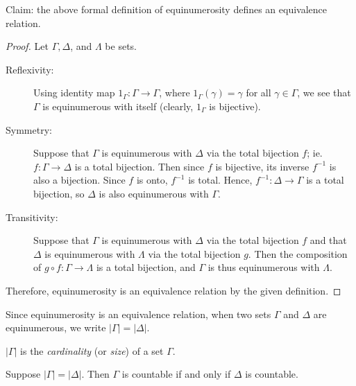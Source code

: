 \documentclass[../../include/open-logic-section]{subfiles}
\begin{document}
\begin{explain} Claim: the above formal definition of equinumerosity defines an equivalence relation.

\begin{proof} Let $\Gamma, \Delta$, and $\Lambda$ be sets.

\begin{description}

\item[Reflexivity:] Using identity map $1_\Gamma : \Gamma \rightarrow \Gamma$, where $1_\Gamma (\gamma) = \gamma$ for all $\gamma \in \Gamma$, we see that $\Gamma$ is equinumerous with itself (clearly, $1_\Gamma$ is bijective).

\item[Symmetry:] Suppose that $\Gamma$ is equinumerous with $\Delta$ via the total bijection $f$; ie. $f: \Gamma \rightarrow \Delta$ is a total bijection. Then since $f$ is bijective, its inverse $f^{-1}$ is also a bijection. Since $f$ is onto, $f^{-1}$ is total. Hence, $f^{-1}:\Delta \rightarrow \Gamma$ is a total bijection, so $\Delta$ is also equinumerous with $\Gamma$. 

\item[Transitivity:] Suppose that $\Gamma$ is equinumerous with $\Delta$ via the total bijection $f$ and that $\Delta$ is equinumerous with $\Lambda$ via the total bijection $g$. Then the composition of $g \circ f: \Gamma \rightarrow \Lambda$ is a total bijection, and $\Gamma$ is thus equinumerous with $\Lambda$.
\end{description}
Therefore, equinumerosity is an equivalence relation by the given definition.
\end{proof}
\end{explain}

Since equinumerosity is an equivalence relation, when two sets $\Gamma$ and $\Delta$ are equinumerous, we write $|\Gamma| = |\Delta|$.

\begin{defn}
$|\Gamma|$ is the \emph{cardinality} (or \emph{size}) of a set $\Gamma$.
\end{defn}

\begin{thm}
Suppose $|\Gamma| = |\Delta|$. Then $\Gamma$ is countable if and only if $\Delta$ is countable.
\end{thm}
\end{document}
